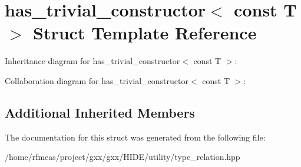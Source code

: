 \hypertarget{structhas__trivial__constructor_3_01const_01T_01_4}{}\section{has\+\_\+trivial\+\_\+constructor$<$ const T $>$ Struct Template Reference}
\label{structhas__trivial__constructor_3_01const_01T_01_4}


Inheritance diagram for has\+\_\+trivial\+\_\+constructor$<$ const T $>$\+:


Collaboration diagram for has\+\_\+trivial\+\_\+constructor$<$ const T $>$\+:
\subsection*{Additional Inherited Members}


The documentation for this struct was generated from the following file\+:\begin{DoxyCompactItemize}
\item 
/home/rfmeas/project/gxx/gxx/\+H\+I\+D\+E/utility/type\+\_\+relation.\+hpp\end{DoxyCompactItemize}
